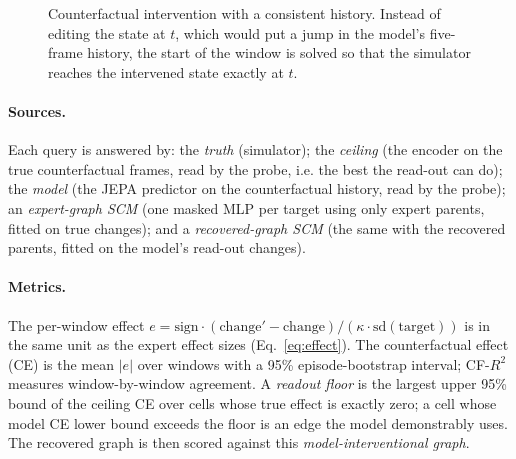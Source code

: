 \documentclass[11pt, a4paper, oneside,enumerate,textcomp]{report}
\newcommand{\Rsq}{R^2}
\begin{document}
\begin{figure}[htbp]
\centering
{}
\caption{Counterfactual intervention with a consistent history. Instead of editing the state at $t$, which would put a jump in the model's five-frame history, the start of the window is solved so that the simulator reaches the intervened state exactly at $t$.}
\label{fig:cf_resolve}
\end{figure}

\paragraph{Sources.} Each query is answered by: the \emph{truth} (simulator); the \emph{ceiling} (the encoder on the true counterfactual frames, read by the probe, i.e. the best the read-out can do); the \emph{model} (the JEPA predictor on the counterfactual history, read by the probe); an \emph{expert-graph SCM} (one masked MLP per target using only expert parents, fitted on true changes); and a \emph{recovered-graph SCM} (the same with the recovered parents, fitted on the model's read-out changes).

\paragraph{Metrics.} The per-window effect $e = \mathrm{sign}\cdot(\text{change}' - \text{change})/(\kappa\cdot \mathrm{sd}(\text{target}))$ is in the same unit as the expert effect sizes (Eq.~\ref{eq:effect}). The counterfactual effect (CE) is the mean $|e|$ over windows with a 95\% episode-bootstrap interval; CF-$\Rsq$ measures window-by-window agreement. A \emph{readout floor} is the largest upper 95\% bound of the ceiling CE over cells whose true effect is exactly zero; a cell whose model CE lower bound exceeds the floor is an edge the model demonstrably uses. The recovered graph is then scored against this \emph{model-interventional graph}.
\end{document}
